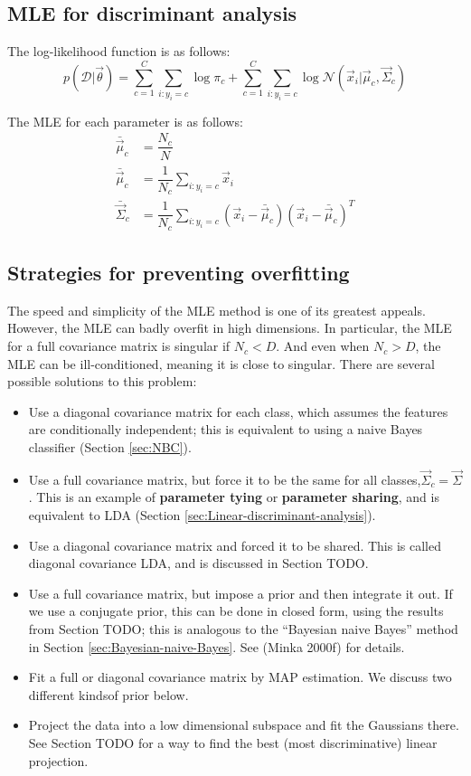 \subsection{MLE for discriminant analysis}
\label{sec:MLE-for-discriminant-analysis}
The log-likelihood function is as follows:
\begin{equation}
p(\mathcal{D}|\vec{\theta})=\sum\limits_{c=1}^C{\sum\limits_{i:y_i=c}{\log\pi_c}}+\sum\limits_{c=1}^C{\sum\limits_{i:y_i=c}{\log\mathcal{N}(\vec{x}_i|\vec{\mu}_c,\vec{\Sigma}_c)}}
\end{equation}

The MLE for each parameter is as follows:
\begin{align}
\bar{\vec{\mu}}_c& = \dfrac{N_c}{N} \\
\bar{\vec{\mu}}_c& = \dfrac{1}{N_c}\sum\limits_{i:y_i=c}\vec{x}_i \\
\bar{\vec{\Sigma}}_c& = \dfrac{1}{N_c}\sum\limits_{i:y_i=c}(\vec{x}_i-\bar{\vec{\mu}}_c)(\vec{x}_i-\bar{\vec{\mu}}_c)^T
\end{align}


\subsection{Strategies for preventing overfitting}
The speed and simplicity of the MLE method is one of its greatest appeals. However, the MLE can badly overfit in high dimensions. In particular, the MLE for a full covariance matrix is singular if $N_c <D$. And even when $N_c >D$, the MLE can be ill-conditioned, meaning it is close to singular. There are several possible solutions to this problem:
\begin{itemize}
\item{Use a diagonal covariance matrix for each class, which assumes the features are conditionally independent; this is equivalent to using a naive Bayes classifier (Section \ref{sec:NBC})}.
\item{Use a full covariance matrix, but force it to be the same for all classes,$\vec{\Sigma}_c=\vec{\Sigma}$. This is an example of \textbf{parameter tying} or \textbf{parameter sharing}, and is equivalent to LDA (Section \ref{sec:Linear-discriminant-analysis}).}
\item{Use a diagonal covariance matrix and forced it to be shared. This is called diagonal covariance LDA, and is discussed in Section TODO.}
\item{Use a full covariance matrix, but impose a prior and then integrate it out. If we use a conjugate prior, this can be done in closed form, using the results from Section TODO; this is analogous to the “Bayesian naive Bayes” method in Section \ref{sec:Bayesian-naive-Bayes}. See (Minka 2000f) for details.}
\item{Fit a full or diagonal covariance matrix by MAP estimation. We discuss two different kindsof prior below.}
\item{Project the data into a low dimensional subspace and fit the Gaussians there. See Section TODO for a way to find the best (most discriminative) linear projection.}
\end{itemize}

